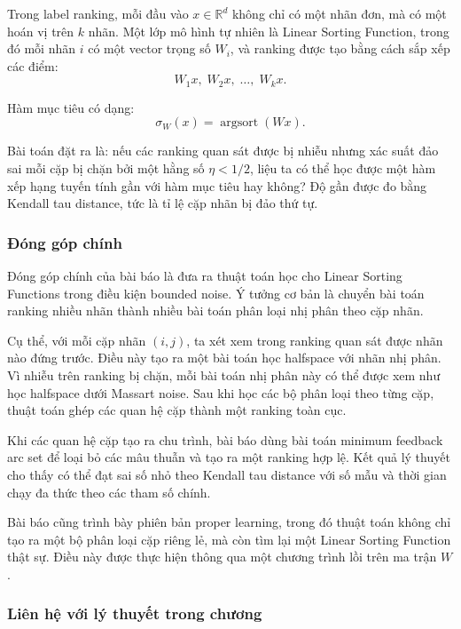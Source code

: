 Trong label ranking, mỗi đầu vào \(x\in\mathbb{R}^d\) không chỉ có một nhãn đơn, mà có một hoán vị trên \(k\) nhãn. Một lớp mô hình tự nhiên là Linear Sorting Function, trong đó mỗi nhãn \(i\) có một vector trọng số \(W_i\), và ranking được tạo bằng cách sắp xếp các điểm:
\[
    W_1x,\; W_2x,\;\ldots,\;W_kx.
\]

Hàm mục tiêu có dạng:
\begin{equation}
    \sigma_W(x)
    =
    \operatorname{argsort}(Wx).
    \label{eq:section10-linear-sorting-function}
\end{equation}

Bài toán đặt ra là: nếu các ranking quan sát được bị nhiễu nhưng xác suất đảo sai mỗi cặp bị chặn bởi một hằng số \(\eta<1/2\), liệu ta có thể học được một hàm xếp hạng tuyến tính gần với hàm mục tiêu hay không? Độ gần được đo bằng Kendall tau distance, tức là tỉ lệ cặp nhãn bị đảo thứ tự.

\subsubsection{Đóng góp chính}

Đóng góp chính của bài báo là đưa ra thuật toán học cho Linear Sorting Functions trong điều kiện bounded noise. Ý tưởng cơ bản là chuyển bài toán ranking nhiều nhãn thành nhiều bài toán phân loại nhị phân theo cặp nhãn.

Cụ thể, với mỗi cặp nhãn \((i,j)\), ta xét xem trong ranking quan sát được nhãn nào đứng trước. Điều này tạo ra một bài toán học halfspace với nhãn nhị phân. Vì nhiễu trên ranking bị chặn, mỗi bài toán nhị phân này có thể được xem như học halfspace dưới Massart noise. Sau khi học các bộ phân loại theo từng cặp, thuật toán ghép các quan hệ cặp thành một ranking toàn cục.

Khi các quan hệ cặp tạo ra chu trình, bài báo dùng bài toán minimum feedback arc set để loại bỏ các mâu thuẫn và tạo ra một ranking hợp lệ. Kết quả lý thuyết cho thấy có thể đạt sai số nhỏ theo Kendall tau distance với số mẫu và thời gian chạy đa thức theo các tham số chính.

Bài báo cũng trình bày phiên bản proper learning, trong đó thuật toán không chỉ tạo ra một bộ phân loại cặp riêng lẻ, mà còn tìm lại một Linear Sorting Function thật sự. Điều này được thực hiện thông qua một chương trình lồi trên ma trận \(W\).

\subsubsection{Liên hệ với lý thuyết trong chương}


